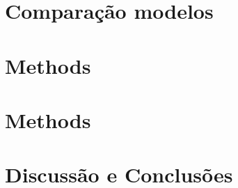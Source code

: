 \documentclass[
10pt, %
a4paper, %
oneside, %
headinclude,footinclude, %
BCOR5mm, %
]{scrartcl}
\begin{document}
\section{Comparação modelos}
\section{Methods}
\section{Methods}

\section{Discussão e Conclusões}




\end{document}
